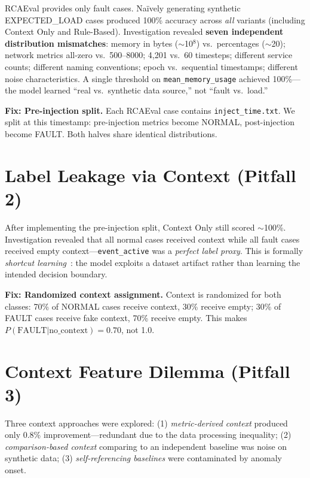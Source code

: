 \documentclass[12pt,a4paper]{report}
\begin{document}
RCAEval provides only fault cases. Na\"ively generating synthetic EXPECTED\_LOAD cases produced 100\% accuracy across \textit{all} variants (including Context Only and Rule-Based). Investigation revealed \textbf{seven independent distribution mismatches}: memory in bytes ($\sim$10$^8$) vs.\ percentages ($\sim$20); network metrics all-zero vs.\ 500--8000; 4,201 vs.\ 60 timesteps; different service counts; different naming conventions; epoch vs.\ sequential timestamps; different noise characteristics. A single threshold on \texttt{mean\_memory\_usage} achieved 100\%---the model learned ``real vs.\ synthetic data source,'' not ``fault vs.\ load.''

\textbf{Fix: Pre-injection split.} Each RCAEval case contains \texttt{inject\_time.txt}. We split at this timestamp: pre-injection metrics become NORMAL, post-injection become FAULT. Both halves share identical distributions.

\section{Label Leakage via Context (Pitfall 2)}

After implementing the pre-injection split, Context Only still scored $\sim$100\%. Investigation revealed that all normal cases received context while all fault cases received empty context---\texttt{event\_active} was a \textit{perfect label proxy}. This is formally \textit{shortcut learning}~\cite{geirhos2020shortcut}: the model exploits a dataset artifact rather than learning the intended decision boundary.

\textbf{Fix: Randomized context assignment.} Context is randomized for both classes: 70\% of NORMAL cases receive context, 30\% receive empty; 30\% of FAULT cases receive fake context, 70\% receive empty. This makes $P(\text{FAULT}|\text{no\_context}) = 0.70$, not 1.0.

\section{Context Feature Dilemma (Pitfall 3)}

Three context approaches were explored: (1) \textit{metric-derived context} produced only 0.8\% improvement---redundant due to the data processing inequality; (2) \textit{comparison-based context} comparing to an independent baseline was noise on synthetic data; (3) \textit{self-referencing baselines} were contaminated by anomaly onset.
\end{document}
